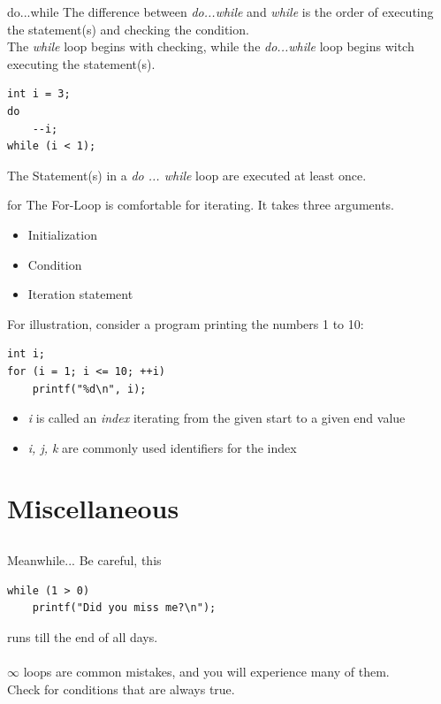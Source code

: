 \begin{frame}[fragile]{do...while}
	The difference between \textit{do...while} and \textit{while} is the order of executing the statement(s) and checking the condition.\\
	\bigskip
	The \textit{while} loop begins with checking, while the \textit{do...while} loop begins witch executing the statement(s).
	\begin{lstlisting}[numbers=none]
int i = 3;
do
	--i;
while (i < 1);
\end{lstlisting}
	\bigskip
	The Statement(s) in a \textit{do ... while} loop are executed at least once.
\end{frame}
\begin{frame}[fragile]{for}
	The For-Loop is comfortable for iterating. It takes three arguments.
	\begin{itemize}
		\item Initialization
		\item Condition
		\item Iteration statement
	\end{itemize}
	\bigskip
	For illustration, consider a program printing the numbers 1 to 10:
	\begin{lstlisting}[numbers=none]
int i;
for (i = 1; i <= 10; ++i)
	printf("%d\n", i);
\end{lstlisting}
	\begin{itemize}
		\item \textit{i} is called an \textit{index} iterating from the given start to a given end value
		\item \textit{i, j, k} are commonly used identifiers for the index
	\end{itemize}
\end{frame}

\section{Miscellaneous}
\subsection{}
\begin{frame}[fragile]{Meanwhile...}
	Be careful, this
	\begin{lstlisting}[numbers=none]
while (1 > 0)
	printf("Did you miss me?\n");
\end{lstlisting}
runs till the end of all days.\\
\ \\$\infty$ loops are common mistakes, and you will experience many of them.\\
Check for conditions that are always true.
\end{frame}

